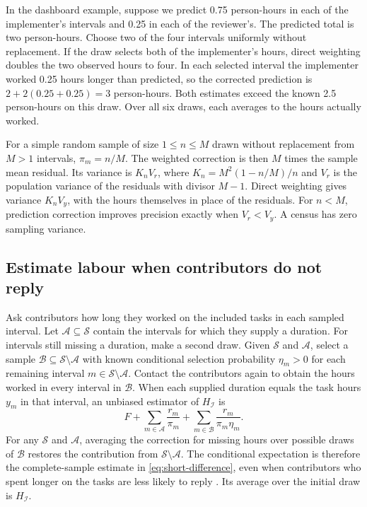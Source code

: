 In the dashboard example, suppose we predict 0.75 person-hours in each of the implementer's intervals and 0.25 in each of the reviewer's. The predicted total is two person-hours. Choose two of the four intervals uniformly without replacement. If the draw selects both of the implementer's hours, direct weighting doubles the two observed hours to four. In each selected interval the implementer worked 0.25 hours longer than predicted, so the corrected prediction is $2+2(0.25+0.25)=3$ person-hours. Both estimates exceed the known 2.5 person-hours on this draw. Over all six draws, each averages to the hours actually worked.

For a simple random sample of size $1\le n\le M$ drawn without replacement from $M>1$ intervals, $\pi_m=n/M$. The weighted correction is then $M$ times the sample mean residual. Its variance is
$K_n V_r$, where $K_n=M^2(1-n/M)/n$ and $V_r$ is the population variance of the residuals with divisor $M-1$. Direct weighting gives variance $K_n V_y$, with the hours themselves in place of the residuals. For $n<M$, prediction correction improves precision exactly when $V_r<V_y$. A census has zero sampling variance.

\subsection{Estimate labour when contributors do not reply}

Ask contributors how long they worked on the included tasks in each sampled interval. Let $\mathcal A\subseteq\mathcal S$ contain the intervals for which they supply a duration. For intervals still missing a duration, make a second draw. Given $\mathcal S$ and $\mathcal A$, select a sample $\mathcal B\subseteq\mathcal S\setminus\mathcal A$ with known conditional selection probability $\eta_m>0$ for each remaining interval $m\in\mathcal S\setminus\mathcal A$. Contact the contributors again to obtain the hours worked in every interval in $\mathcal B$. When each supplied duration equals the task hours $y_m$ in that interval, an unbiased estimator of $H_{\mathcal I}$ is
\[
  F+\sum_{m\in\mathcal A}\frac{r_m}{\pi_m}
   +\sum_{m\in\mathcal B}\frac{r_m}{\pi_m\eta_m}.
\]
For any $\mathcal S$ and $\mathcal A$, averaging the correction for missing hours over possible draws of $\mathcal B$ restores the contribution from $\mathcal S\setminus\mathcal A$. The conditional expectation is therefore the complete-sample estimate in \eqref{eq:short-difference}, even when contributors who spent longer on the tasks are less likely to reply \cite{nonresponsefollowup}. Its average over the initial draw is $H_{\mathcal I}$.

